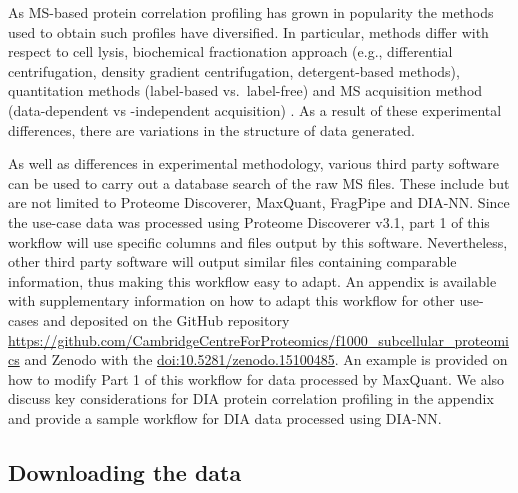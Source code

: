 \documentclass[9pt,a4paper,]{extarticle}
\begin{document}
As MS-based protein correlation profiling has grown in popularity the methods
used to obtain such profiles have diversified. In particular, methods differ
with respect to cell lysis, biochemical fractionation approach (e.g., differential
centrifugation, density gradient centrifugation, detergent-based methods), quantitation
methods (label-based vs.~label-free) and MS acquisition method (data-dependent vs
-independent acquisition) \citep{Breckels2024}. As a result of these experimental differences,
there are variations in the structure of data generated.

As well as differences in experimental methodology, various third party software
can be used to carry out a database search of the raw MS files. These include but are
not limited to Proteome Discoverer, MaxQuant, FragPipe and DIA-NN. Since the
use-case data was processed using Proteome Discoverer v3.1, part 1 of this workflow
will use specific columns and files output by this software. Nevertheless, other
third party software will output similar files containing comparable information,
thus making this workflow easy to adapt. An appendix is available with
supplementary information on how to adapt this workflow for other use-cases
and deposited on the GitHub repository \url{https://github.com/CambridgeCentreForProteomics/f1000_subcellular_proteomics}
and Zenodo with the \href{http://doi.org/10.5281/zenodo.15100485}{doi:10.5281/zenodo.15100485}. An example is provided on how to
modify Part 1 of this workflow for data processed by MaxQuant. We also discuss
key considerations for DIA protein correlation profiling in the appendix and
provide a sample workflow for DIA data processed using DIA-NN.

\subsection{Downloading the data}\label{downloading-the-data}
\end{document}
